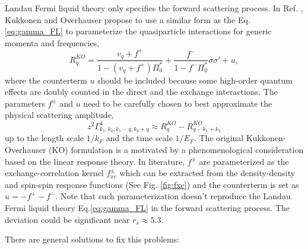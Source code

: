 \documentclass[reprint,amsmath,amssymb,aps,prb]{revtex4-1}
\begin{document}
Landau Fermi liquid theory only specifies the forward scattering process. In Ref. , Kukkonen and Overhauser propose to use a similar form as the Eq.\eqref{eq:gamma_FL} to parameterize the quasiparticle interactions for generic momenta and frequencies,
\begin{equation}
    \label{eq:KO}
    R_q^{KO} = \frac{v_q+f^+}{1-(v_q+f^+)\Pi^*_0}+\frac{f^-}{1-f^-\Pi_0^*}\sigma\sigma'+ u,
\end{equation}
where the counterterm $u$ should be included because some high-order quantum effects are doubly counted in the direct and the exchange interactions. The parameters $f^\pm$ and $u$ need to be carefully chosen to best approximate the physical scattering amplitude,
\begin{equation}
    z^2\Gamma^4_{k_1, k_2; k_1-q, k_2+q} \approx R_q^{KO} - R^{KO}_{q-k_1+k_2}
\end{equation}
up to the length scale $1/k_F$ and the time scale $1/E_F$.
The original Kukkonen-Overhauser (KO) formulation is a motivated by a phenomenological consideration based on the linear response theory. In literature, $f^\pm$ are parameterized as the exchange-correlation kernel $f_{xc}^\pm$ which can be extracted from the density-density and spin-spin response functions (See Fig. \ref{fig:fxc}) and the counterterm is set as $u=-f^+-f^-$. Note that such parameterization doesn't reproduce the Landau Fermi liquid theory Eq.\eqref{eq:gamma_FL} in the forward scattering process. The deviation could be significant near $r_s\approx 5.3$.

There are general solutions to fix this problems:
\end{document}
